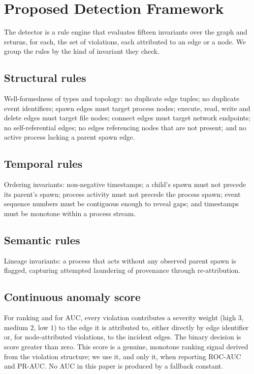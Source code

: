 \documentclass[journal]{IEEEtran}
\begin{document}
\section{Proposed Detection Framework}
\label{sec:framework}
The detector is a rule engine that evaluates fifteen invariants over the graph
and returns, for each, the set of violations, each attributed to an edge or a
node. We group the rules by the kind of invariant they check.

\subsection{Structural rules}
Well-formedness of types and topology: no duplicate edge tuples; no duplicate
event identifiers; spawn edges must target process nodes; execute, read, write
and delete edges must target file nodes; connect edges must target network
endpoints; no self-referential edges; no edges referencing nodes that are not
present; and no active process lacking a parent spawn edge.

\subsection{Temporal rules}
Ordering invariants: non-negative timestamps; a child's spawn must not precede
its parent's spawn; process activity must not precede the process spawn; event
sequence numbers must be contiguous enough to reveal gaps; and timestamps must
be monotone within a process stream.

\subsection{Semantic rules}
Lineage invariants: a process that acts without any observed parent spawn is
flagged, capturing attempted laundering of provenance through re-attribution.

\subsection{Continuous anomaly score}
For ranking and for AUC, every violation contributes a severity weight (high
$3$, medium $2$, low $1$) to the edge it is attributed to, either directly by
edge identifier or, for node-attributed violations, to the incident edges. The
binary decision is score greater than zero. This score is a genuine, monotone
ranking signal derived from the violation structure; we use it, and only it,
when reporting ROC-AUC and PR-AUC. No AUC in this paper is produced by a
fallback constant.
\end{document}
